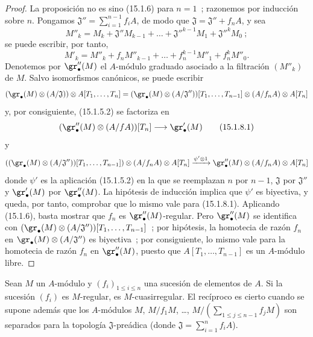 \begin{proof}
La proposición no es sino (15.1.6) para $n=1$~; razonemos por inducción sobre
$n$. Pongamos
$\mathfrak{J}''=\sum_{i=1}^{n-1}f_iA$,
de modo que $\mathfrak{J}=\mathfrak{J}''+f_nA$, y sea
\[
  M''_k=M_k+\mathfrak{J}''M_{k-1}+\ldots+
  \mathfrak{J}''^{k-1}M_1+\mathfrak{J}''^kM_0~;
\]
se puede escribir, por tanto,
\[
  M'_k=M''_k+f_nM''_{k-1}+\ldots+f_n^{k-1}M''_1+f_n^kM''_0.
\]
Denotemos por $\gr''_\bullet(M)$ el $A$-módulo graduado asociado a la filtración
$(M''_k)$ de $M$. Salvo isomorfismos canónicos, se puede escribir
\[
  (\gr_\bullet(M)\otimes(A/\mathfrak{J}))\otimes A[T_1,\ldots,T_n]
  =
  (\gr_\bullet(M)\otimes(A/\mathfrak{J}''))[T_1,\ldots,T_{n-1}]
  \otimes(A/f_nA)\otimes A[T_n]
\]
y, por consiguiente, (15.1.5.2) se factoriza en
\[
  (\gr''_\bullet(M)\otimes(A/fA))[T_n]\longrightarrow\gr'_\bullet(M)
  \tag{15.1.8.1}\label{0.15.1.8.1-fr}
\]
y
\[
  ((\gr_\bullet(M)\otimes(A/\mathfrak{J}''))[T_1,\ldots,T_{n-1}])
  \otimes(A/f_nA)\otimes A[T_n]
  \xrightarrow{\psi'\otimes1}
  \gr''_\bullet(M)\otimes(A/f_nA)\otimes A[T_n]
\]
donde $\psi'$ es la aplicación (15.1.5.2) en la que se reemplazan $n$ por
$n-1$, $\mathfrak{J}$ por $\mathfrak{J}''$ y $\gr'_\bullet(M)$ por
$\gr''_\bullet(M)$. La hipótesis de inducción implica que $\psi'$ es
biyectiva, y queda, por tanto, comprobar que lo mismo vale para (15.1.8.1).
Aplicando (15.1.6), basta mostrar que $f_n$ es
$\gr''_\bullet(M)$-regular. Pero $\gr''_\bullet(M)$ se identifica con
$(\gr_\bullet(M)\otimes(A/\mathfrak{J}''))[T_1,\ldots,T_{n-1}]$~;
por hipótesis, la homotecia de razón $f_n$ en
$\gr_\bullet(M)\otimes(A/\mathfrak{J}'')$ es biyectiva~; por consiguiente, lo
mismo vale para la homotecia de razón $f_n$ en $\gr''_\bullet(M)$, puesto que
$A[T_1,\ldots,T_{n-1}]$ es un $A$-módulo libre.
\end{proof}
\begin{proposition}[15.1.9]
\label{0.15.1.9-fr}
Sean $M$ un $A$-módulo y $(f_i)_{1\leq i\leq n}$ una sucesión de elementos de
$A$. Si la sucesión $(f_i)$ es $M$-regular, es $M$-cuasirregular. El recíproco
es cierto cuando se supone además que los $A$-módulos
$M$, $M/f_1M$, \ldots, $M/\left(\sum_{1\leq j\leq n-1}f_jM\right)$
son separados para la topología $\mathfrak{J}$-preádica (donde
$\mathfrak{J}=\sum_{i=1}^n f_iA$).
\end{proposition}

